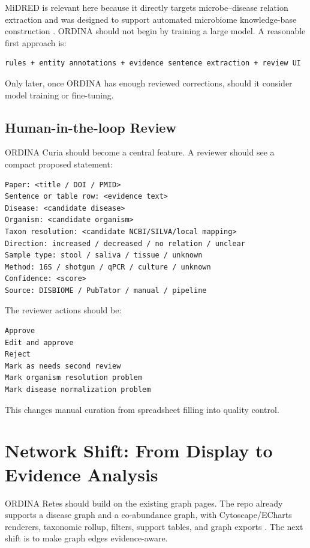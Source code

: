 \documentclass[11pt,a4paper]{article}
\begin{document}
MiDRED is relevant here because it directly targets microbe--disease relation extraction and was designed to support automated microbiome knowledge-base construction \cite{midred}. ORDINA should not begin by training a large model. A reasonable first approach is:

\begin{verbatim}
rules + entity annotations + evidence sentence extraction + review UI
\end{verbatim}

Only later, once ORDINA has enough reviewed corrections, should it consider model training or fine-tuning.

\subsection{Human-in-the-loop Review}

ORDINA Curia should become a central feature. A reviewer should see a compact proposed statement:

\begin{verbatim}
Paper: <title / DOI / PMID>
Sentence or table row: <evidence text>
Disease: <candidate disease>
Organism: <candidate organism>
Taxon resolution: <candidate NCBI/SILVA/local mapping>
Direction: increased / decreased / no relation / unclear
Sample type: stool / saliva / tissue / unknown
Method: 16S / shotgun / qPCR / culture / unknown
Confidence: <score>
Source: DISBIOME / PubTator / manual / pipeline
\end{verbatim}

The reviewer actions should be:

\begin{verbatim}
Approve
Edit and approve
Reject
Mark as needs second review
Mark organism resolution problem
Mark disease normalization problem
\end{verbatim}

This changes manual curation from spreadsheet filling into quality control.

\section{Network Shift: From Display to Evidence Analysis}

ORDINA Retes should build on the existing graph pages. The repo already supports a disease graph and a co-abundance graph, with Cytoscape/ECharts renderers, taxonomic rollup, filters, support tables, and graph exports \cite{ordina-roadmap}. The next shift is to make graph edges evidence-aware.
\end{document}

